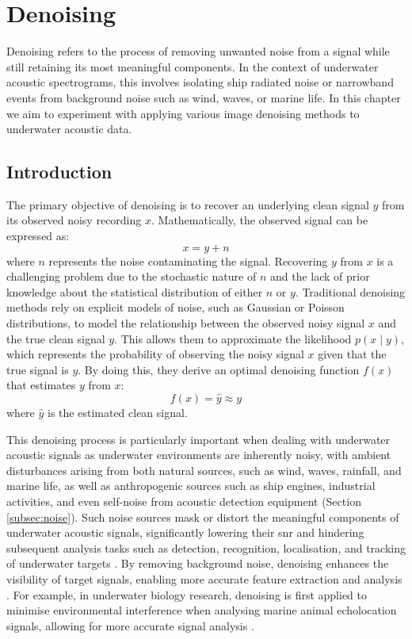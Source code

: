 \chapter{Denoising}\label{chap:denoising}

Denoising refers to the process of removing unwanted noise from a signal while still retaining its most meaningful components. In the context of underwater acoustic spectrograms, this involves isolating ship radiated noise or narrowband events from background noise such as wind, waves, or marine life. In this chapter we aim to experiment with applying various image denoising methods to underwater acoustic data.

\section{Introduction}

The primary objective of denoising is to recover an underlying clean signal $y$ from its observed noisy recording $x$. Mathematically, the observed signal can be expressed as:
\begin{equation}
    x = y + n
\end{equation}
where $n$ represents the noise contaminating the signal. Recovering $y$ from $x$ is a challenging problem due to the stochastic nature of $n$ and the lack of prior knowledge about the statistical distribution of either $n$ or $y$. Traditional denoising methods rely on explicit models of noise, such as Gaussian or Poisson distributions, to model the relationship between the observed noisy signal $x$ and the true clean signal $y$. This allows them to approximate the likelihood $p(x \mid y)$, which represents the probability of observing the noisy signal $x$ given that the true signal is $y$. By doing this, they derive an optimal denoising function $f(x)$ that estimates $y$ from $x$:
\begin{equation}
    f(x) = \hat{y} \approx y
\end{equation}
where $\hat{y}$ is the estimated clean signal. 

This denoising process is particularly important when dealing with underwater acoustic signals as underwater environments are inherently noisy, with ambient disturbances arising from both natural sources, such as wind, waves, rainfall, and marine life, as well as anthropogenic sources such as ship engines, industrial activities, and even self-noise from acoustic detection equipment (Section \ref{subsec:noise}). Such noise sources mask or distort the meaningful components of underwater acoustic signals, significantly lowering their \acrlong{snr} and hindering subsequent analysis tasks such as detection, recognition, localisation, and tracking of underwater targets \cite{wang_stacked_2020, dong_bidirectional_2022, pauline_low-complexity_2022}. By removing background noise, denoising enhances the visibility of target signals, enabling more accurate feature extraction and analysis \cite{yin_research_2023, zhou_dbsa-net_2023, song_method_2024}. For example, in underwater biology research, denoising is first applied to minimise environmental interference when analysing marine animal echolocation signals, allowing for more accurate signal analysis \cite{yang_transfer_2021}.

